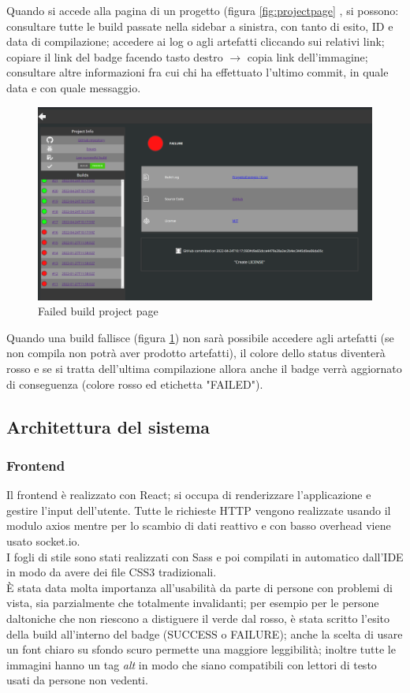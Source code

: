 \documentclass{report}
\begin{document}
Quando si accede alla pagina di un progetto (figura  \ref{fig:projectpage} , si possono: consultare tutte le build passate nella sidebar a sinistra, con tanto di esito, ID e data di compilazione; accedere ai log o agli artefatti cliccando sui relativi link; copiare il link del badge facendo tasto destro $\rightarrow$ copia link dell'immagine; consultare altre informazioni fra cui chi ha effettuato l'ultimo commit, in quale data e con quale messaggio.\\
\begin{figure}[h!]
\includegraphics[scale=0.3]{progetto fail.png}
\caption{Failed build project page}
\label{fig:projectfail}
\end{figure}
Quando una build fallisce (figura \ref{fig:projectfail}) non sarà possibile accedere agli artefatti (se non compila non potrà aver prodotto artefatti), il colore dello status diventerà rosso e se si tratta dell'ultima compilazione allora anche il badge verrà aggiornato di conseguenza (colore rosso ed etichetta "FAILED").
\subsection{Architettura del sistema}
\subsubsection{Frontend}
Il frontend è realizzato con React; si occupa di renderizzare l'applicazione e gestire l'input dell'utente. Tutte le richieste HTTP vengono realizzate usando il modulo axios mentre per lo scambio di dati reattivo e con basso overhead viene usato socket.io. \\
I fogli di stile sono stati realizzati con Sass e poi compilati in automatico dall'IDE in modo da avere dei file CSS3 tradizionali.\\
È stata data molta importanza all'usabilità da parte di persone con problemi di vista, sia parzialmente che totalmente invalidanti; per esempio per le persone daltoniche che non riescono a distiguere il verde dal rosso, è stata scritto l'esito della build all'interno del badge (SUCCESS o FAILURE); anche la scelta di usare un font chiaro su sfondo scuro permette una maggiore leggibilità; inoltre tutte le immagini hanno un tag \textit{alt} in modo che siano compatibili con lettori di testo usati da persone non vedenti.
\end{document}
